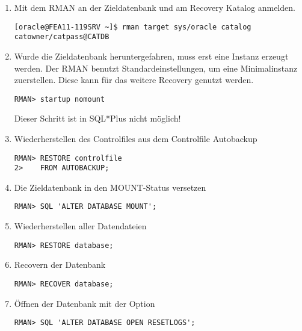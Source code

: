           \begin{enumerate}
            \item Mit dem RMAN an der Zieldatenbank und am Recovery Katalog anmelden.
              \begin{lstlisting}[caption={An der Zieldatenbank und am Recovery Katalog anmelden},label=admin1502,language=rman]
[oracle@FEA11-119SRV ~]$ rman target sys/oracle catalog catowner/catpass@CATDB
              \end{lstlisting}
            \item Wurde die Zieldatenbank heruntergefahren, muss erst eine Instanz erzeugt werden. Der RMAN benutzt Standardeinstellungen, um eine Minimalinstanz zuerstellen. Diese kann für das weitere Recovery genutzt werden.
              \begin{lstlisting}[caption={Zieldatenbank im RMAN in den NOMOUNT-Status bringen},label=admin1503,language=rman,alsolanguage=sqlplus]
RMAN> startup nomount
              \end{lstlisting}
              \begin{merke}
                Dieser Schritt ist in SQL*Plus nicht möglich!
              \end{merke}
            \item Wiederherstellen des Controlfiles aus dem Controlfile Autobackup
              \begin{lstlisting}[caption={Wiederherstellen des Controlfiles},label=admin1504,language=rman]
RMAN> RESTORE controlfile
2>    FROM AUTOBACKUP;
              \end{lstlisting}
            \item Die Zieldatenbank in den MOUNT-Status versetzen
              \begin{lstlisting}[caption={Zieldatenbank mounten},label=admin1505,language=rman,emph={[9]ALTER,DATABASE,MOUNT},emphstyle={[9]\color{magenta}\bfseries}]
RMAN> SQL 'ALTER DATABASE MOUNT';
              \end{lstlisting}
            \item Wiederherstellen aller Datendateien
              \begin{lstlisting}[caption={Datendateien wiederherstellen},label=admin1506,language=rman]
RMAN> RESTORE database;
              \end{lstlisting}
            \item Recovern der Datenbank
              \begin{lstlisting}[caption={Recovern der Datenbank},label=admin1507,language=rman]
RMAN> RECOVER database;
              \end{lstlisting}
            \item Öffnen der Datenbank mit der Option 
              \begin{lstlisting}[caption={Datenbank mit open resetlogs öffnen},label=admin1508,language=rman,emph={[9]ALTER,DATABASE,OPEN,RESETLOGS},emphstyle={[9]\color{magenta}\bfseries}]
RMAN> SQL 'ALTER DATABASE OPEN RESETLOGS';
              \end{lstlisting}
            \end{enumerate}
